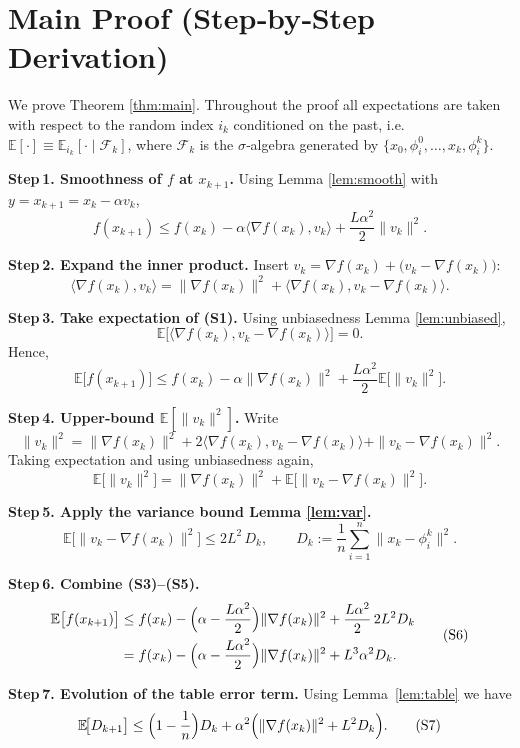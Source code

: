 \documentclass{article}
\newcommand{\E}{\mathbb{E}}
\begin{document}
\section*{Main Proof (Step‑by‑Step Derivation)}
We prove Theorem \ref{thm:main}.  Throughout the proof all expectations are taken
with respect to the random index $i_k$ conditioned on the past, i.e.
$\E[\cdot]\equiv\E_{i_k}[\cdot\mid\mathcal{F}_k]$, where $\mathcal{F}_k$ is the $\sigma$‑algebra generated by $\{x_0,\phi_i^0,\dots,x_k,\phi_i^k\}$.

\noindent\textbf{Step 1. Smoothness of $f$ at $x_{k+1}$.}  
Using Lemma \ref{lem:smooth} with $y=x_{k+1}=x_k-\alpha v_k$,
\[
f(x_{k+1})\le f(x_k)-\alpha\langle\nabla f(x_k),v_k\rangle
                +\frac{L\alpha^{2}}{2}\|v_k\|^{2}.
\tag{S1}
\]

\noindent\textbf{Step 2. Expand the inner product.}  
Insert $v_k=\nabla f(x_k)+\bigl(v_k-\nabla f(x_k)\bigr)$:
\[
\langle\nabla f(x_k),v_k\rangle
 =\|\nabla f(x_k)\|^{2}
   +\langle\nabla f(x_k),v_k-\nabla f(x_k)\rangle.
\tag{S2}
\]

\noindent\textbf{Step 3. Take expectation of (S1).}  
Using unbiasedness Lemma \ref{lem:unbiased},
\[
\E\!\bigl[\langle\nabla f(x_k),v_k-\nabla f(x_k)\rangle\bigr]=0.
\]
Hence,
\[
\E\bigl[f(x_{k+1})\bigr]
\le f(x_k)-\alpha\|\nabla f(x_k)\|^{2}
   +\frac{L\alpha^{2}}{2}\E\!\bigl[\|v_k\|^{2}\bigr].
\tag{S3}
\]

\noindent\textbf{Step 4. Upper‑bound $\E[\|v_k\|^{2}]$.}  
Write
\[
\|v_k\|^{2}= \|\nabla f(x_k)\|^{2}
          +2\langle\nabla f(x_k),v_k-\nabla f(x_k)\rangle
          +\|v_k-\nabla f(x_k)\|^{2}.
\]
Taking expectation and using unbiasedness again,
\[
\E\!\bigl[\|v_k\|^{2}\bigr]
= \|\nabla f(x_k)\|^{2}
  +\E\!\bigl[\|v_k-\nabla f(x_k)\|^{2}\bigr].
\tag{S4}
\]

\noindent\textbf{Step 5. Apply the variance bound Lemma \ref{lem:var}.}  
\[
\E\!\bigl[\|v_k-\nabla f(x_k)\|^{2}\bigr]
\le 2L^{2}\,D_k,\qquad D_k:=\frac1n\sum_{i=1}^{n}\|x_k-\phi_i^{k}\|^{2}.
\tag{S5}
\]

\noindent\textbf{Step 6. Combine (S3)–(S5).}
\[
\begin{aligned}
\E\bigl[f(x_{k+1})\bigr]
&\le f(x_k)-\Bigl(\alpha-\frac{L\alpha^{2}}{2}\Bigr)\|\nabla f(x_k)\|^{2}
   +\frac{L\alpha^{2}}{2}\,2L^{2}D_k\\
&= f(x_k)-\Bigl(\alpha-\frac{L\alpha^{2}}{2}\Bigr)\|\nabla f(x_k)\|^{2}
   +L^{3}\alpha^{2}D_k .
\end{aligned}
\tag{S6}
\]

\noindent\textbf{Step 7. Evolution of the table error term.}  
Using Lemma~\ref{lem:table} we have
\[
\E\!\bigl[D_{k+1}\bigr]
\le\Bigl(1-\frac{1}{n}\Bigr)D_k
   +\alpha^{2}\Bigl(\|\nabla f(x_k)\|^{2}+L^{2}D_k\Bigr).
\tag{S7}
\]
\end{document}
